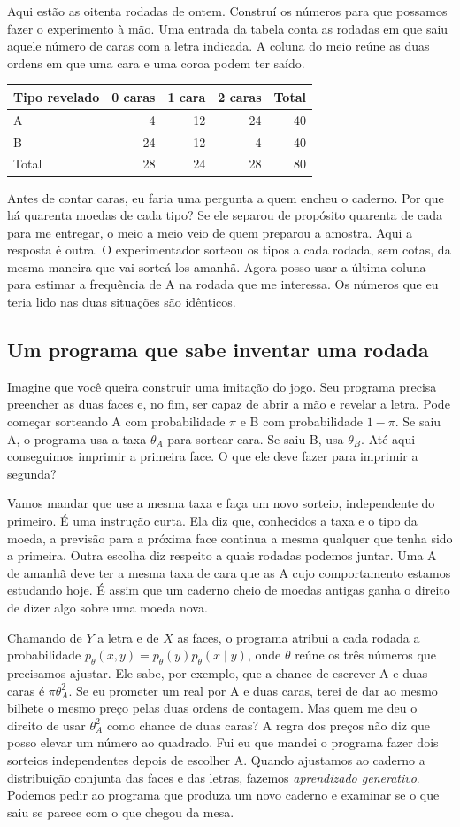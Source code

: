 \documentclass[12pt,oneside]{article}
\newcommand{\secao}[1]{\Needspace{5.2\baselineskip}\subsection*{#1}}
\newcommand{\bookanchor}[1]{\phantomsection\label{#1}}
\begin{document}
Aqui estão as oitenta rodadas de ontem. Construí os números para que possamos fazer o experimento à mão. Uma entrada da tabela conta as rodadas em que saiu aquele número de caras com a letra indicada. A coluna do meio reúne as duas ordens em que uma cara e uma coroa podem ter saído.
\begin{center}
\begin{tabular}{lrrrr}
\toprule
Tipo revelado & 0 caras & 1 cara & 2 caras & Total \\
\midrule
A & 4 & 12 & 24 & 40 \\
B & 24 & 12 & 4 & 40 \\
\midrule
Total & 28 & 24 & 28 & 80 \\
\bottomrule
\end{tabular}
\end{center}

Antes de contar caras, eu faria uma pergunta a quem encheu o caderno. Por que há quarenta moedas de cada tipo? Se ele separou de propósito quarenta de cada para me entregar, o meio a meio veio de quem preparou a amostra. Aqui a resposta é outra. O experimentador sorteou os tipos a cada rodada, sem cotas, da mesma maneira que vai sorteá-los amanhã. Agora posso usar a última coluna para estimar a frequência de A na rodada que me interessa. Os números que eu teria lido nas duas situações são idênticos.

\secao{Um programa que sabe inventar uma rodada}
Imagine que você queira construir uma imitação do jogo. Seu programa precisa preencher as duas faces e, no fim, ser capaz de abrir a mão e revelar a letra. Pode começar sorteando A com probabilidade $\pi$ e B com probabilidade $1-\pi$. Se saiu A, o programa usa a taxa $\theta_A$ para sortear cara. Se saiu B, usa $\theta_B$. Até aqui conseguimos imprimir a primeira face. O que ele deve fazer para imprimir a segunda?

Vamos mandar que use a mesma taxa e faça um novo sorteio, independente do primeiro. É uma instrução curta. Ela diz que, conhecidos a taxa e o tipo da moeda, a previsão para a próxima face continua a mesma qualquer que tenha sido a primeira. Outra escolha diz respeito a quais rodadas podemos juntar. Uma A de amanhã deve ter a mesma taxa de cara que as A cujo comportamento estamos estudando hoje. É assim que um caderno cheio de moedas antigas ganha o direito de dizer algo sobre uma moeda nova.

Chamando\bookanchor{topic-03-1} de $Y$ a letra e de $X$ as faces, o programa atribui a cada rodada a probabilidade $p_\theta(x,y)=p_\theta(y)p_\theta(x\mid y)$, onde $\theta$ reúne os três números que precisamos ajustar. Ele sabe, por exemplo, que a chance de escrever A e duas caras é $\pi\theta_A^2$. Se eu prometer um real por A e duas caras, terei de dar ao mesmo bilhete o mesmo preço pelas duas ordens de contagem. Mas quem me deu o direito de usar $\theta_A^2$ como chance de duas caras? A regra dos preços não diz que posso elevar um número ao quadrado. Fui eu que mandei o programa fazer dois sorteios independentes depois de escolher A. Quando ajustamos ao caderno a distribuição conjunta das faces e das letras, fazemos \emph{aprendizado generativo}. Podemos pedir ao programa que produza um novo caderno e examinar se o que saiu se parece com o que chegou da mesa.
\end{document}
